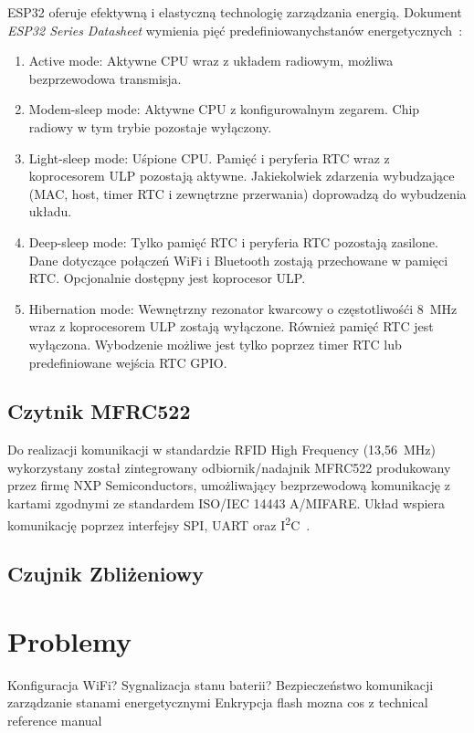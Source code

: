         ESP32 oferuje efektywną i elastyczną technologię zarządzania energią. Dokument \textit{ESP32 Series Datasheet} wymienia pięć predefiniowanychstanów energetycznych~\cite{esp32-ds}:
        \begin{enumerate}
            \item Active mode: Aktywne CPU wraz z układem radiowym, możliwa bezprzewodowa transmisja.
            \item Modem-sleep mode: Aktywne CPU z konfigurowalnym zegarem. Chip radiowy w tym trybie pozostaje wyłączony.
            \item Light-sleep mode: Uśpione CPU. Pamięć i peryferia RTC wraz z koprocesorem ULP pozostają aktywne. Jakiekolwiek zdarzenia wybudzające (MAC, host, timer RTC i zewnętrzne przerwania) doprowadzą do wybudzenia układu.
            \item Deep-sleep mode: Tylko pamięć RTC i peryferia RTC pozostają zasilone. Dane dotyczące połączeń WiFi i Bluetooth zostają przechowane w pamięci RTC. Opcjonalnie dostępny jest koprocesor ULP.
            \item Hibernation mode: Wewnętrzny rezonator kwarcowy o częstotliwośći 8~MHz wraz z koprocesorem ULP zostają wyłączone. Również pamięć RTC jest wyłączona. Wybodzenie możliwe jest tylko poprzez timer RTC lub predefiniowane wejścia RTC GPIO.
        \end{enumerate}

    \subsection{Czytnik MFRC522}

        Do realizacji komunikacji w standardzie RFID High Frequency (13,56~MHz) wykorzystany został zintegrowany odbiornik/nadajnik MFRC522 produkowany przez firmę NXP Semiconductors, umożliwający bezprzewodową komunikację z kartami zgodnymi ze standardem ISO/IEC 14443 A/MIFARE. Układ wspiera komunikację poprzez interfejsy SPI, UART oraz I\textsuperscript{2}C~\cite{mfrc522-ds}.

    \subsection{Czujnik Zbliżeniowy}


\section{Problemy}
    Konfiguracja WiFi?
    Sygnalizacja stanu baterii?
    Bezpieczeństwo komunikacji
    zarządzanie stanami energetycznymi
    Enkrypcja flash
    mozna cos z technical reference manual

